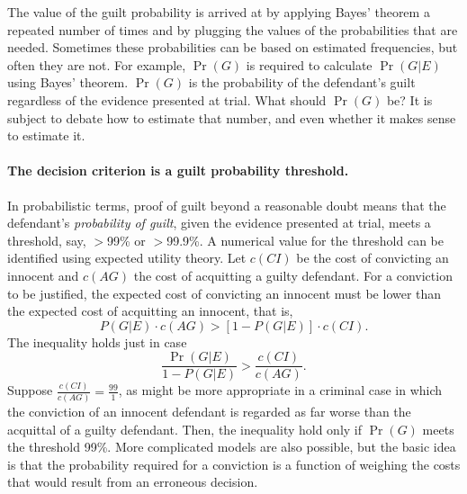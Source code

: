 \documentclass[10pt]{article}
\begin{document}
The value of the guilt probability is arrived at by applying Bayes' theorem a 
repeated number of times and by plugging the values of the probabilities that are needed. 
Sometimes these probabilities can be %
based on estimated frequencies, but often %
they are not. For example, $\Pr(G)$ is required to calculate $\Pr(G|E)$ using Bayes' theorem. 
$\Pr(G)$ is the probability of the defendant's guilt regardless of the evidence 
presented at trial. What should $\Pr(G)$ be? 
It is subject to debate how to estimate that number, and even whether it makes sense to estimate it.


\paragraph{The decision criterion is a guilt probability threshold.}

In probabilistic terms, proof of guilt beyond a reasonable doubt means 
that the defendant's \textit{probability of guilt}, given the evidence presented at trial, meets a 
threshold, say, $>$99\% or $>$99.9\%. 
%
A numerical value for the threshold can be identified using expected utility theory. 
Let $c(CI)$ be the cost of convicting an innocent and $c(AG)$ the cost 
of acquitting a guilty defendant. For a conviction to be justified, the 
expected cost of convicting an innocent must be lower than the expected 
cost of acquitting an innocent, that is, 
%
\[ P(G|E) \cdot c(AG) > [1-P(G|E)] \cdot c(CI) .\]
%
The inequality holds just in case 
%
\[ \frac{\Pr(G|E)}{1- P(G|E)} > \frac{c(CI)}{c(AG)}.\]
%
Suppose $ \frac{c(CI)}{c(AG)}=\frac{99}{1}$, as might be more appropriate in a criminal 
case in which the conviction of an innocent defendant is regarded as far worse than the acquittal of a guilty defendant.
Then, the inequality hold only if $\Pr(G)$ meets the threshold 99\%.
More complicated models are also possible, but the basic idea is that the probability 
required for a conviction is a function of weighing the 
costs that would result from an erroneous decision. 
\end{document}
